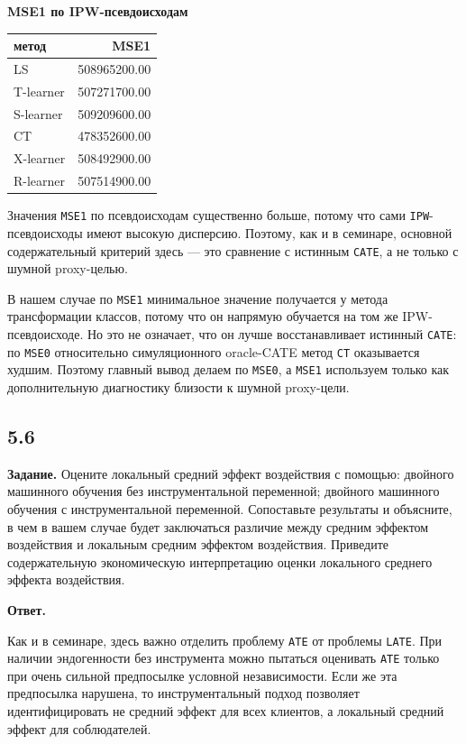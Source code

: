 \documentclass[11pt]{article}
\newcounter{none}
\begin{document}
    \textbf{MSE1 по IPW-псевдоисходам}

{\def\LTcaptype{none} %
\begin{longtable}[]{@{}lr@{}}
\toprule\noalign{}
метод & MSE1 \\
\midrule\noalign{}
\endhead
\bottomrule\noalign{}
\endlastfoot
LS & 508965200.00 \\
T-learner & 507271700.00 \\
S-learner & 509209600.00 \\
CT & 478352600.00 \\
X-learner & 508492900.00 \\
R-learner & 507514900.00 \\
\end{longtable}
}

    Значения \texttt{MSE1} по псевдоисходам существенно больше, потому что
сами \texttt{IPW}-псевдоисходы имеют высокую дисперсию. Поэтому, как и в
семинаре, основной содержательный критерий здесь --- это сравнение с
истинным \texttt{CATE}, а не только с шумной proxy-целью.

В нашем случае по \texttt{MSE1} минимальное значение получается у метода
трансформации классов, потому что он напрямую обучается на том же
IPW-псевдоисходе. Но это не означает, что он лучше восстанавливает
истинный \texttt{CATE}: по \texttt{MSE0} относительно симуляционного
oracle-CATE метод \texttt{CT} оказывается худшим. Поэтому главный вывод
делаем по \texttt{MSE0}, а \texttt{MSE1} используем только как
дополнительную диагностику близости к шумной proxy-цели.

    \subsection{5.6}\label{section}

\textbf{Задание.} Оцените локальный средний эффект воздействия с
помощью: двойного машинного обучения без инструментальной переменной;
двойного машинного обучения с инструментальной переменной. Сопоставьте
результаты и объясните, в чем в вашем случае будет заключаться различие
между средним эффектом воздействия и локальным средним эффектом
воздействия. Приведите содержательную экономическую интерпретацию оценки
локального среднего эффекта воздействия.

\textbf{Ответ.}

Как и в семинаре, здесь важно отделить проблему \texttt{ATE} от проблемы
\texttt{LATE}. При наличии эндогенности без инструмента можно пытаться
оценивать \texttt{ATE} только при очень сильной предпосылке условной
независимости. Если же эта предпосылка нарушена, то инструментальный
подход позволяет идентифицировать не средний эффект для всех клиентов, а
локальный средний эффект для соблюдателей.
\end{document}
